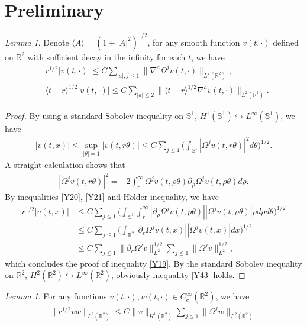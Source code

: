 \documentclass[11pt, reqno]{amsart}
\theoremstyle{definition}
\theoremstyle{remark}
\newtheorem{lem}[thm]{Lemma}
\theoremstyle{definition}
\numberwithin{equation}{section}
\numberwithin{equation}{section}
\def\leq{\leqslant}
\begin{document}
\section{Preliminary}
\begin{lem}\label{lem1}
Denote $\langle
A\rangle=(1+|A|^2)^{1/2}$, for any smooth function $v(t,\cdot)$ defined on $\mathbb R^2$ with
sufficient decay in the infinity for each $t$, we have
\begin{align}\label{Y19}
&r^{1/2}|v(t,\cdot)|\leq
C\sum_{|a|,j\leq1}\|\nabla^a\Omega^jv(t,\cdot)\|_{L^2(\mathbb R^2)},
\\&\label{Y43}\langle t-r\rangle^{1/2}|v(t,\cdot)|\leq C\sum_{|a|\leq2}\|\langle t-r\rangle^{1/2}\nabla^av(t,\cdot)\|_{L^2(\mathbb R^2)}.
\end{align}
\end{lem}
\begin{proof}
By using a standard Sobolev inequality on $\mathbb S^1$,
$H^1(\mathbb S^1)\hookrightarrow L^{\infty}(\mathbb S^1)$, we have
\begin{align}\label{Y20}
|v(t,x)|\leq \sup_{|\theta|=1}|v(t,r\theta)|\leq
C\sum_{j\leq1}\Big(\int_{\mathbb
S^1}|\Omega^jv(t,r\theta)|^2d\theta\Big)^{1/2}.
\end{align}
A straight calculation shows that
\begin{align}\label{Y21}
|\Omega^jv(t,r\theta)|^2=-2\int_{r}^{\infty}\Omega^jv(t,\rho\theta)\partial_{\rho}\Omega^jv(t,\rho\theta)d\rho.
\end{align}
By inequalities \eqref{Y20}, \eqref{Y21} and H$\ddot{o}$lder
inequality, we have
\begin{align*}
r^{1/2}|v(t,x)|&\leq C\sum_{j\leq1}\Big(\int_{\mathbb
S^1}\int_{r}^{\infty}|\partial_{\rho}\Omega^jv(t,\rho\theta)||\Omega^jv(t,\rho\theta)|\rho
d\rho d\theta\Big)^{1/2}\\&\leq C\sum_{j\leq1}\Big(\int_{\mathbb
R^2} |\partial_r\Omega^jv(t,x)||\Omega^jv(t,x)| dx\Big)^{1/2}
\\&\leq C\sum_{j\leq1}\|\partial_r\Omega^jv\|^{1/2}_{L^2}\sum_{j\leq1}\|\Omega^jv\|^{1/2}_{L^2},
\end{align*}
which concludes the proof of inequality \eqref{Y19}. By the standard
Sobolev inequality on $\mathbb R^2$, $H^2(\mathbb
R^2)\hookrightarrow L^{\infty}(\mathbb R^2)$, obviously inequality
\eqref{Y43} holds.
\end{proof}
\begin{lem}\label{lem2}
For any functions $v(t,\cdot),w(t,\cdot)\in C_c^{\infty}(\mathbb R^2)$, we have
\begin{align*}
\|r^{1/2}vw\|_{L^2(\mathbb R^2)}\leq C\|v\|_{H^1(\mathbb
R^2)}\sum_{j\leq1}\|\Omega^jw\|_{L^2(\mathbb R^2)}.
\end{align*}
\end{lem}
\end{document}
